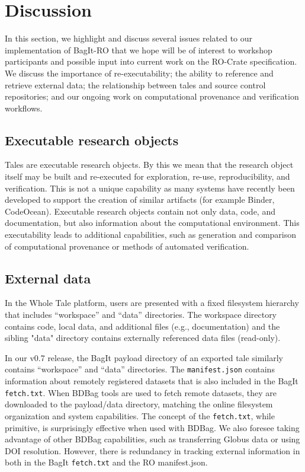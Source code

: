 \documentclass[conference]{IEEEtran}
\begin{document}
\section{Discussion} \label{discussion}

In this section, we highlight and discuss several issues related to our implementation of BagIt-RO that we hope will be of interest to workshop participants and possible input into current work on the RO-Crate specification. We discuss the importance of re-executability; the ability to reference and retrieve external data; the relationship between tales and source control repositories; and our ongoing work on computational provenance and verification workflows.

\subsection{Executable research objects}
Tales are executable research objects. By this we mean that the research object itself may be built and re-executed for exploration, re-use, reproducibility, and verification. This is not a unique capability as many systems have recently been developed to support the creation of similar artifacts (for example Binder, CodeOcean). Executable research objects contain not only data, code, and documentation, but also information about the computational environment. This executability leads to additional capabilities, such as generation and comparison of computational provenance or methods of automated verification.

\subsection{External data}
In the Whole Tale platform, users are presented with a fixed filesystem hierarchy that includes  ``workspace'' and ``data'' directories. The workspace directory contains code, local data, and additional files (e.g., documentation) and the sibling "data" directory contains externally referenced data files (read-only).

In our v0.7 release, the BagIt payload directory of an exported tale similarly contains ``workspace'' and ``data'' directories. The \texttt{manifest.json} contains information about remotely registered datasets that is also included in the BagIt \texttt{fetch.txt}. When BDBag tools are used to fetch remote datasets, they are downloaded to the payload/data directory, matching the online filesystem organization and system capabilities. The concept of the \texttt{fetch.txt}, while primitive, is surprisingly effective when used with BDBag. We also foresee taking advantage of other BDBag capabilities, such as transferring Globus data or using DOI resolution. However, there is redundancy in tracking external information in both in the BagIt \texttt{fetch.txt} and the RO manifest.json. 
\end{document}
